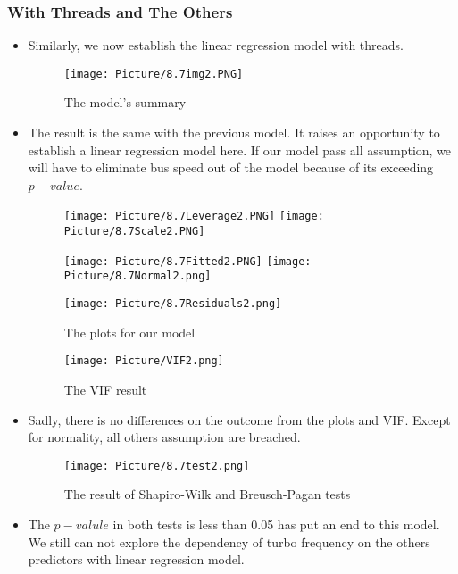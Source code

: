 \documentclass[a4paper]{article}
\begin{document}
\subsubsection{With Threads and The Others}
\begin{itemize}
    \item[] Similarly, we now establish the linear regression model with threads.

     \begin{figure}[H]
        \centering
        \texttt{[image: Picture/8.7img2.PNG]}
        \caption{The model's summary}
        \label{8.3.2.1}
    \end{figure}
    
     \item[] The result is the same with the previous model. It raises an opportunity to establish a linear regression model here. If our model pass all assumption, we will have to eliminate bus speed out of the model because of its exceeding $p-value$.
 
     \begin{figure}[H]
        \centering
        \texttt{[image: Picture/8.7Leverage2.PNG]}
        \texttt{[image: Picture/8.7Scale2.PNG]}
        \label{8.3.2.2}
    \end{figure}
    
    \begin{figure}[H]
        \centering
        \texttt{[image: Picture/8.7Fitted2.PNG]}
        \texttt{[image: Picture/8.7Normal2.png]}
        \label{8.3.3.3}
    \end{figure}
    
     \begin{figure}[H]
        \centering
        \texttt{[image: Picture/8.7Residuals2.png]}
        \caption{The plots for our model}
        \label{8.3.4.4}
    \end{figure}

    \begin{figure}[H]
        \centering
        \texttt{[image: Picture/VIF2.png]}
        \caption{The VIF result}
        \label{8.3.5.5}
    \end{figure}
    
    \item[] Sadly, there is no differences on the outcome from the plots and VIF. Except for normality, all others assumption are breached.
    
    \begin{figure}[H]
        \centering
        \texttt{[image: Picture/8.7test2.png]}
        \caption{The result of Shapiro-Wilk and Breusch-Pagan tests}
        \label{8.3.4}
    \end{figure}
     
    \item[] The $p-valule$ in both tests is less than 0.05 has put an end to this model. We still can not explore the dependency of turbo frequency on the others predictors with linear regression model.
\end{itemize}
\end{document}
